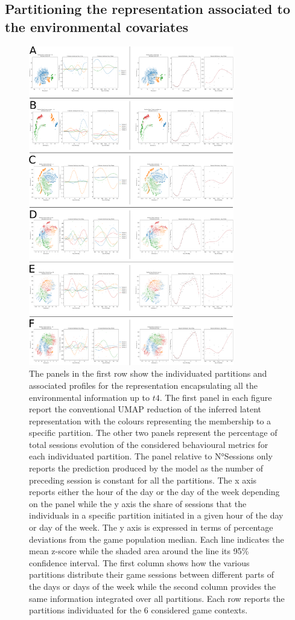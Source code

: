 \subsection{Partitioning the representation associated to the environmental covariates}
\begin{figure}[ht]
\includegraphics[width=0.8\textwidth]{images/chapter_4/clust_env_all.png}
\centering
\caption[Partitions of the representations generated by the RNN architectures from the environmental metrics]{The panels in the first row show the individuated partitions and associated profiles for the representation encapsulating all the environmental information up to $t4$. The first panel in each figure report the conventional UMAP reduction of the inferred latent representation with the colours representing the membership to a specific partition. The other two panels represent the percentage of total sessions  evolution of the considered behavioural metrics for each individuated partition. The panel relative to N°Sessions only reports the prediction produced by the model as the number of preceding session is constant for all the partitions. The x axis reports either the hour of the day or the day of the week depending on the panel while the y axis the share of sessions that the individuals in a specific partition initiated in a given hour of the day or day of the week. The y axis is expressed in terms of percentage deviations from the game population median. Each line indicates the mean z-score while the shaded area around the line its 95\% confidence interval. The first column shows how the various partitions distribute their game sessions between different parts of the days or days of the week while the second column provides the same information integrated over all partitions. Each row reports the partitions individuated for the 6 considered game contexts.}

\end{figure}
